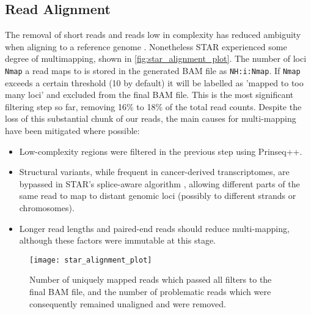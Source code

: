 \subsection{Read Alignment}
The removal of short reads and reads low in complexity has reduced ambiguity when aligning to a reference genome \citep{rhoads2015pacbio}. Nonetheless STAR experienced some degree of multimapping, shown in \autoref{fig:star_alignment_plot}. The number of loci \texttt{Nmap} a read maps to is stored in the generated BAM file as \texttt{NH:i:Nmap}. If \texttt{Nmap} exceeds a certain threshold (10 by default) it will be labelled as 'mapped to too many loci' and excluded from the final BAM file. This is the most significant filtering step so far, removing 16\% to 18\% of the total read counts. Despite the loss of this substantial chunk of our reads, the main causes \citep{rhoads2015pacbio} for multi-mapping have been mitigated where possible: 
\begin{itemize}
\item[] Low-complexity regions were filtered in the previous step using Prinseq++.
\item[] Structural variants, while frequent in cancer-derived transcriptomes, are bypassed in STAR's splice-aware algorithm \citep{Dobin2013}, allowing different parts of the same read to map to distant genomic loci (possibly to different strands or chromosomes).
\item[] Longer read lengths and paired-end reads should reduce multi-mapping, although these factors were immutable at this stage.
\end{itemize}


\begin{figure}[!h]
    \centering
    \texttt{[image: star\_alignment\_plot]}
    \caption{Number of uniquely mapped reads which passed all filters to the final BAM file, and the number of problematic reads which were consequently remained unaligned and were removed.} 
    \label{fig:star_alignment_plot}
\end{figure}
\newpage


